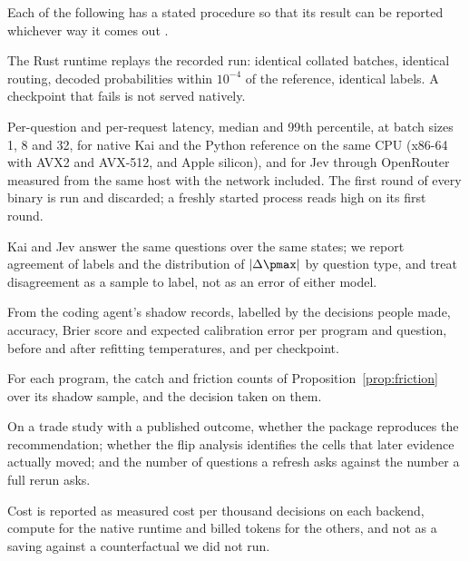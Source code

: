 Each of the following has a stated procedure so that its result can be
reported whichever way it comes out \proposed.

\begin{description}[leftmargin=1.5em,style=nextline]
  \item[E1 Parity.] The Rust runtime replays the recorded run: identical
    collated batches, identical routing, decoded probabilities within
    $10^{-4}$ of the reference, identical labels. A checkpoint that fails is
    not served natively.
  \item[E2 Latency and throughput.] Per-question and per-request latency,
    median and 99th percentile, at batch sizes 1, 8 and 32, for native Kai and
    the Python reference on the same CPU (x86-64 with AVX2 and AVX-512, and
    Apple silicon), and for Jev through OpenRouter measured from the same
    host with the network included. The first round of every binary is run
    and discarded; a freshly started process reads high on its first round.
  \item[E3 Agreement.] Kai and Jev answer the same questions over the same
    states; we report agreement of labels and the distribution of
    $|\Delta\pmax|$ by question type, and treat disagreement as a sample to
    label, not as an error of either model.
  \item[E4 Accuracy and calibration on our traffic.] From the coding agent's
    shadow records, labelled by the decisions people made, accuracy, Brier
    score and expected calibration error per program and question, before and
    after refitting temperatures, and per checkpoint.
  \item[E5 Promotion.] For each program, the catch and friction counts of
    Proposition~\ref{prop:friction} over its shadow sample, and the decision
    taken on them.
  \item[E6 Studies.] On a trade study with a published outcome, whether the
    package reproduces the recommendation; whether the flip analysis
    identifies the cells that later evidence actually moved; and the number of
    questions a refresh asks against the number a full rerun asks.
\end{description}

Cost is reported as measured cost per thousand decisions on each backend,
compute for the native runtime and billed tokens for the others, and not as a
saving against a counterfactual we did not run.
